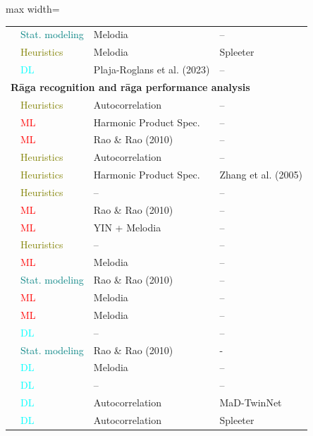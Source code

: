 \begin{table}[p]
\begin{adjustbox}{max width=\textwidth}
\begin{tabular}{l p{2.2cm} p{3.8cm} p{2.7cm}}
\citep{ganguli-motifs} & \textcolor{teal}{Stat. modeling} & Melodia & -- \\
\citep{nuttall-matrix} & \textcolor{olive}{Heuristics} & Melodia & Spleeter \\
\citep{nuttall-sancaras} & \textcolor{cyan}{DL} & Plaja-Roglans et al. (2023) & -- \\
\midrule
\multicolumn{4}{l}{\textbf{R\={a}ga recognition and r\={a}ga performance analysis}} \\
\midrule
\citep{pandey-tansen} & \textcolor{olive}{Heuristics} & Autocorrelation & -- \\
\citep{chordia-raga} & \textcolor{red}{ML} & Harmonic Product Spec. & -- \\
\citep{belle-raga} & \textcolor{red}{ML} & Rao \& Rao (2010) & -- \\
\citep{shetty-raga} & \textcolor{olive}{Heuristics} & Autocorrelation & -- \\
\citep{sridhar-raga} & \textcolor{olive}{Heuristics} & Harmonic Product Spec. & Zhang et al. (2005) \\
\citep{bhattacharjee-raga_transition} & \textcolor{olive}{Heuristics} & -- & -- \\
\citep{koduri-survey} & \textcolor{red}{ML} & Rao \& Rao (2010) & -- \\
\citep{koduri-raga} & \textcolor{red}{ML} & YIN + Melodia & -- \\
\citep{dighe-swara_raga} & \textcolor{olive}{Heuristics} & -- & -- \\
\citep{kumar-raga} & \textcolor{red}{ML} & Melodia & -- \\
\citep{ganguli-ungrammatical}  & \textcolor{teal}{Stat. modeling} & Rao \& Rao (2010) & -- \\
\citep{gulati-time_delayed} & \textcolor{red}{ML} & Melodia & -- \\
\citep{gulati-phrase_raga} & \textcolor{red}{ML} & Melodia & -- \\
\citep{ross-raga_similarity} & \textcolor{cyan}{DL} & -- & -- \\
\citep{ganguli-distributional} & \textcolor{teal}{Stat. modeling} & Rao \& Rao (2010) & - \\
\citep{anand-raga} & \textcolor{cyan}{DL} & Melodia & -- \\
\citep{chowdhuri-raga} & \textcolor{cyan}{DL} & -- & -- \\
\citep{madhusudhan-deepsrgm} & \textcolor{cyan}{DL} & Autocorrelation & MaD-TwinNet \\
\citep{john-carnatic_classification} & \textcolor{cyan}{DL} & Autocorrelation & Spleeter \\

\end{tabular}
\end{adjustbox}
\end{table}
